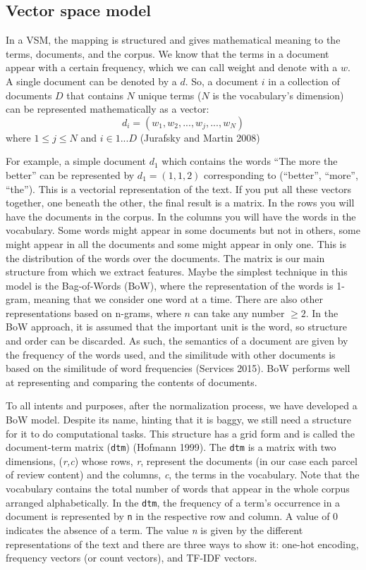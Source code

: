 \subsection{Vector space model}\label{sec-vsm-bow}

In a VSM, the mapping is structured and gives mathematical meaning
to the terms, documents, and the corpus. We know that the terms in a
document appear with a certain frequency, which we can call weight
and denote with a \(w\). A single document can be denoted by a \(d\).
So, a document \(i\) in a collection of documents \(D\) that contains
\(N\) unique terms (\(N\) is the vocabulary's dimension) can be
represented mathematically as a vector:
\[d_i=(w_1, w_2, ..., w_j, ..., w_N)\] where \(1 \leq j \leq N\) and
\(i \in 1...D\) (Jurafsky and Martin 2008)

For example, a simple document \(d_1\) which contains the words ``The more the
better'' can be represented by \(d_1=(1,1,2)\) corresponding to
(``better'', ``more'', ``the''). This is a vectorial representation of
the text. If you put all these vectors together, one beneath the other,
the final result is a matrix. In the rows you will have the documents in
the corpus. In the columns you will have the words in the vocabulary.
Some words might appear in some documents but not in others, some
might appear in all the documents and some might appear in only one. This is the distribution of the words over the documents. The
matrix is our main structure from which we extract features. Maybe the
simplest technique in this model is the Bag-of-Words (BoW), where the
representation of the words is 1-gram, meaning that we consider one
word at a time. There are also other representations based on n-grams,
where \(n\) can take any number \(\geq 2\). In the BoW approach, it is
assumed that the important unit is the word, so structure and order can
be discarded. As such, the semantics of a document are given by the
frequency of the words used, and the similitude with other documents is
based on the similitude of word frequencies (Services 2015). BoW
performs well at representing and comparing the contents of documents.

To all intents and purposes, after the normalization process, we have developed a BoW model.
Despite its name, hinting that it is baggy, we still need a structure for it to
do computational tasks. This structure has a grid form and is called the
document-term matrix (\texttt{dtm}) (Hofmann 1999). The \texttt{dtm}
is a matrix with two dimensions, (\emph{r,c}) whose rows,
\emph{r}, represent the documents (in our case each parcel of review content) and
the columns, \emph{c}, the terms in the vocabulary. Note that the
vocabulary contains the total number of words that appear in the whole corpus
arranged alphabetically. In the \texttt{dtm}, the frequency of a term's
occurrence in a document is represented by \texttt{n} in the respective
row and column. A value of 0 indicates the absence of a term. The value
\emph{n} is given by the different representations of the text and there
are three ways to show it: one-hot encoding, frequency vectors (or
count vectors), and TF-IDF vectors.

